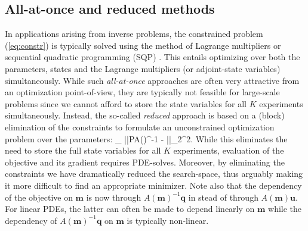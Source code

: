 \documentclass{iopart}
\begin{document}
\subsection{All-at-once and reduced methods}
In applications arising from inverse problems, the constrained problem (\ref{eq:constr}) is typically solved using the method of Lagrange multipliers \cite{Haber2000,Grote2014} or sequential quadratic programming (SQP) \cite{Dennis1998,Heinkenschloss2008}. This entails optimizing over both the parameters, states and the Lagrange multipliers (or adjoint-state variables) simultaneously. While such \emph{all-at-once} approaches are often very attractive from an optimization point-of-view, they are typically not feasible for large-scale problems since we cannot afford to store the state variables for all $K$ experiments simultaneously. Instead, the so-called \emph{reduced} approach is based on a (block) elimination of the constraints to formulate an unconstrained optimization problem over the parameters:
\bq
\label{eq:red}
\min_{} ||PA()^{-1} - ||_2^2.
\eq
While this eliminates the need to store the full state variables for all $K$ experiments, evaluation of the objective and its gradient requires PDE-solves. Moreover, by eliminating the constraints we have dramatically reduced the search-space, thus arguably making it more difficult to find an appropriate minimizer. Note also that the dependency of the objective on $\mathbf{m}$ is now through $A(\mathbf{m})^{-1}\mathbf{q}$ in stead of through $A(\mathbf{m})\mathbf{u}$. For linear PDEs, the latter can often be made to depend linearly on $\mathbf{m}$ while the dependency of $A(\mathbf{m})^{-1}\mathbf{q}$ on $\mathbf{m}$ is typically non-linear.
\end{document}
